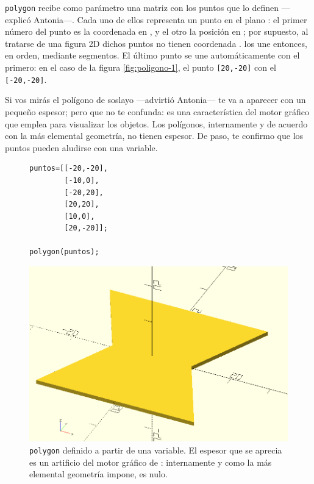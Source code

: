   \guillemotright\lstinline!polygon! recibe como parámetro una matriz
  con los puntos que lo definen ---explicó Antonia---. Cada uno de
  ellos representa un punto en el plano : el primer número
  del punto es la coordenada en , y el otro la posición en
  ; por supuesto, al tratarse de una figura 2D dichos puntos
  no tienen coordenada .  \openscad{} los une entonces, en
  orden, mediante segmentos. El último punto se une automáticamente
  con el primero: en el caso de la figura \ref{fig:poligono-1}, el
  punto \lstinline![20,-20]! con el \lstinline![-20,-20]!.

  \guillemotright Si vos mirás el polígono de soslayo ---advirtió
  Antonia--- te va a aparecer con un pequeño espesor; pero que
    no te confunda: es una característica del motor gráfico que emplea
    \openscad{} para visualizar los objetos. Los polígonos,
    internamente y de acuerdo con la más elemental geometría, no
    tienen espesor. De paso, te confirmo que los puntos pueden
    aludirse con una variable.

    \vfill
    
  \begin{figure}[ht]
  \begin{minipage}[]{.4\textwidth}%
    \begin{lstlisting}
puntos=[[-20,-20],
        [-10,0],
        [-20,20],
        [20,20],
        [10,0],
        [20,-20]];
         
polygon(puntos);
    \end{lstlisting}
  \end{minipage}\hfill
  \begin{minipage}[]{.6\textwidth}%
      \flushright
      \includegraphics[width=.95\textwidth]{imagenes/poligono-soslayo}
    \end{minipage}
    \caption{\lstinline!polygon! definido a partir de una variable. El
      espesor que se aprecia es un artificio del motor gráfico de
      \openscad{}: internamente y como la más elemental geometría
      impone, es nulo.}
    \label{fig:poligono-soslayo}
  \end{figure}



